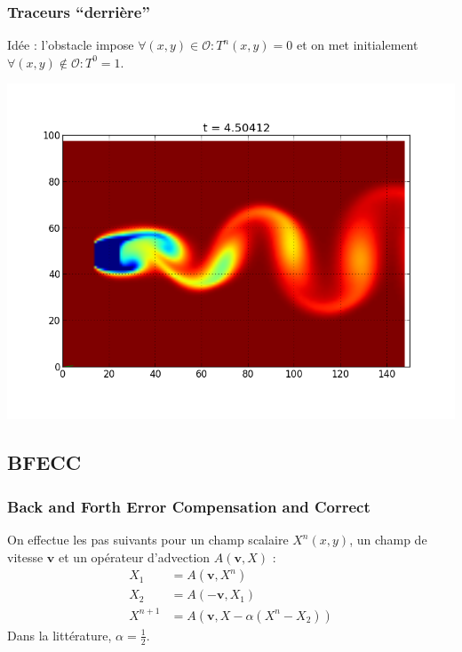\documentclass{beamer}
\renewcommand\O{\mathcal{O}}
\newcommand{\vect}[1]{\boldsymbol{#1}}
\begin{document}
  \begin{frame}
    \frametitle{Traceurs ``derrière''}
    Idée : l'obstacle impose $\forall (x,y) \in \O: T^n(x,y) = 0$ et on met
    initialement  $\forall (x,y) \not\in \O : T^0 = 1$.
    \begin{center}
      \includegraphics[height=0.6\textheight]{tracer1.png}
    \end{center}
  \end{frame}
  \subsection{BFECC}
  \begin{frame}
    \frametitle{Back and Forth Error Compensation and Correct }
    On effectue les pas suivants pour un champ scalaire $X^n(x,y)$, un
    champ de vitesse $\vect{v}$ et un opérateur d'advection
    $A(\vect{v},X)$ :
    \begin{align}
      X_1 & = A(\vect{v},X^n) \\
      X_2 & = A(-\vect{v},X_1) \\
      X^{n+1} & = A(\vect{v},X - \alpha(X^n - X_2))
    \end{align}
    Dans la littérature, $\alpha = \frac{1}{2}$.
  \end{frame}
\end{document}
